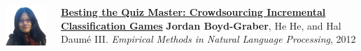 \documentclass[compress]{beamer}
\begin{document}
\begin{frame}{}

  \begin{columns}
        \includegraphics[width=0.9\linewidth]{general_figures/hehe}
        \begin{block}{{\bf \href{http://cs.colorado.edu/~jbg//docs/qb_emnlp_2012.pdf}{Besting the Quiz Master: Crowdsourcing Incremental Classification Games}}}
          {\bf Jordan Boyd-Graber}, He He, and Hal {Daum\'{e} III}. \emph{Empirical Methods in Natural Language Processing}, 2012
        \end{block}
  \end{columns}
\end{frame}
\end{document}
